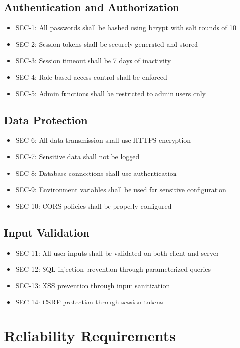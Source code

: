 \documentclass{scrreprt}
\begin{document}
\subsection{Authentication and Authorization}
\begin{itemize}
\item SEC-1: All passwords shall be hashed using bcrypt with salt rounds of 10
\item SEC-2: Session tokens shall be securely generated and stored
\item SEC-3: Session timeout shall be 7 days of inactivity
\item SEC-4: Role-based access control shall be enforced
\item SEC-5: Admin functions shall be restricted to admin users only
\end{itemize}

\subsection{Data Protection}
\begin{itemize}
\item SEC-6: All data transmission shall use HTTPS encryption
\item SEC-7: Sensitive data shall not be logged
\item SEC-8: Database connections shall use authentication
\item SEC-9: Environment variables shall be used for sensitive configuration
\item SEC-10: CORS policies shall be properly configured
\end{itemize}

\subsection{Input Validation}
\begin{itemize}
\item SEC-11: All user inputs shall be validated on both client and server
\item SEC-12: SQL injection prevention through parameterized queries
\item SEC-13: XSS prevention through input sanitization
\item SEC-14: CSRF protection through session tokens
\end{itemize}

\section{Reliability Requirements}
\end{document}
